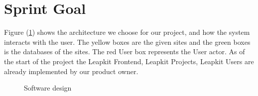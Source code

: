 \section{Sprint Goal}

Figure (\ref{fig:design}) shows the architecture we choose for our
project, and how the system interacts with the user. The yellow boxes
are the given sites and the green boxes is the databases of the sites.
The red User box represents the User actor. As of the start of the project
the Leapkit Frontend, Leapkit Projects, Leapkit Users are already implemented by 
our product owner.

\begin{figure}[h]
    \centering
    
    \caption{Software design}
    \label{fig:design}
\end{figure}
